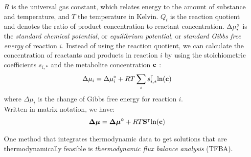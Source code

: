 $R$ is the universal gas constant, which relates energy to the amount of substance and temperature, and $T$ the temperature in Kelvin. $Q_i$ is the reaction quotient and denotes the ratio of product concentration to reactant concentration. $\Delta \mu \degree_i$ is the \textit{standard chemical potential}, or \textit{equilibrium potential}, or \textit{standard Gibbs free energy} of reaction $i$.
Instead of using the reaction quotient, we can calculate the concentration of reactants and products in reaction $i$ by using the stoichiometric coefficients $s_{i,*}$ and the metabolite concentration $\bold c$ \cite{noor_removing_2018}:
\begin{equation*}
    \Delta \mu_i = \Delta \mu \degree_i + RT \sum_{i} s_{i,*}^\intercal \mathrm{ln} (\bold c)
    \label{Eq:lawOfThermodynamics}
\end{equation*}
where $\Delta \mu_i$ is the change of Gibbs free energy for reaction $i$. \\
Written in matrix notation, we have:
\begin{equation}
   \boldsymbol{\Delta \mu} = \boldsymbol{\Delta \mu \degree} + RT \bold S^\intercal \mathrm{ln}(\bold c)
\end{equation}

One method that integrates thermodynamic data to get solutions that are thermodynamically feasible is \textit{thermodynamic flux balance analysis} (TFBA). 

